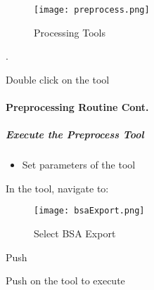  \noindent \textcolor{HyperlinkBlue1}{\scriptsize{}}
  \begin{wrapfigure}{r}{0.5\textwidth}
  \centering
      \texttt{[image: preprocess.png]}
  \vspace{-.1in}

  \caption{Processing Tools}
  \end{wrapfigure}
  .
  \vspace{2in}

  \vspace{.5in}

 
 \noindent Double click on the tool


 \clearpage


 \paragraph*{Preprocessing Routine Cont.}

  \subparagraph{Execute the Preprocess Tool}
  \vspace{.15in}

  \begin{itemize}
  \item Set parameters of the tool
  \end{itemize}
 
 \vspace{.15in}

 \noindent In the tool, navigate to:
  \noindent \textcolor{HyperlinkBlue1}{\scriptsize{}}
 
  \begin{figure}[h!]
  \centering
      \texttt{[image: bsaExport.png]}
  \vspace{-.1in}

  \caption{Select BSA Export}
 \end{figure}
 
 {\bigbtn Push   \lookArrow} 

 {\bigbtn Push  on the tool to execute  \lookArrow} 

